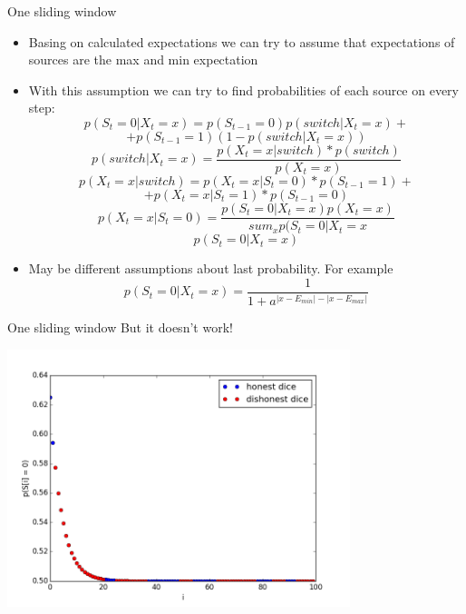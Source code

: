 \documentclass[hyperref=unicode,graphics=pdflatex,13pt]{beamer}
\begin{document}
\begin{frame}{One sliding window}
\begin{itemize}
   \item Basing on calculated expectations we can try to assume that expectations of sources are the max and min expectation
   \item With this assumption we can try to find probabilities of each source on every step:
   \footnotesize$$p(S_t = 0 | X_t = x) = p(S_{t - 1} = 0) p(switch | X_t = x) +$$
   $$+p(S_{t - 1} = 1) (1 - p(switch | X_t = x))$$
   $$p(switch | X_t = x) = \frac{p(X_t = x| switch) * p(switch)}{p(X_t = x)}$$
   \footnotesize$$p(X_t = x| switch) = p(X_t = x | S_t = 0) * p(S_{t - 1} = 1) + $$
   $$+p(X_t = x | S_t = 1) * p(S_{t - 1} = 0)$$
   $$p(X_t = x | S_t = 0) = \frac{p(S_t = 0 | X_t = x)p(X_t = x)}{sum_{x} p(S_t = 0 | X_t = x}$$
   $$p(S_t = 0 | X_t = x)$$
   \item May be different assumptions about last probability. For example $$p(S_t = 0 | X_t = x) = \frac{1}{1 + a^{|x - E_{min}| - |x - E_{max}|}}$$
\end{itemize}
\end{frame}

\begin{frame}{One sliding window}
 But it doesn't work!
 
 \includegraphics[width = 10cm]{one_window_probabilities.png}
\end{frame}
\end{document}
